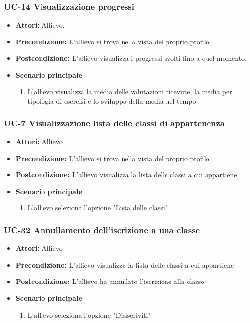 	\subsubsection{UC-14 Visualizzazione progressi}
	\begin{itemize}
			\item \textbf{Attori:} Allievo.
			\item \textbf{Precondizione:} L'allievo si trova nella vista del proprio profilo.
			\item \textbf{Postcondizione:} L'allievo visualizza i progressi svolti fino a quel momento.
			\item \textbf{Scenario principale:}
				\begin{enumerate}
					\item L'allievo visualizza la media delle valutazioni ricevute, la media per tipologia di esercizi e lo sviluppo della media nel tempo
				\end{enumerate}
	\end{itemize}
	
	\subsubsection{UC-7 Visualizzazione lista delle classi di appartenenza}
		\begin{itemize}
			\item \textbf{Attori:} Allievo
			\item \textbf{Precondizione:} L'allievo si trova nella vista del proprio profilo
			\item \textbf{Postcondizione:} L'allievo visualizza la lista delle classi a cui appartiene
			\item \textbf{Scenario principale:}
			\begin{enumerate}
				\item L'allievo seleziona l'opzione "Lista delle classi"
			\end{enumerate}
		\end{itemize}			

	\subsubsection{UC-32 Annullamento dell'iscrizione a una classe}
		\begin{itemize}
			\item \textbf{Attori:} Allievo
			\item \textbf{Precondizione:} L'allievo visualizza la lista delle classi a cui appartiene
			\item \textbf{Postcondizione:} L'allievo ha annullato l'iscrizione alla classe
			\item \textbf{Scenario principale:}
			\begin{enumerate}
				\item L'allievo seleziona l'opzione "Disiscriviti"
			\end{enumerate}
		\end{itemize}					
		
